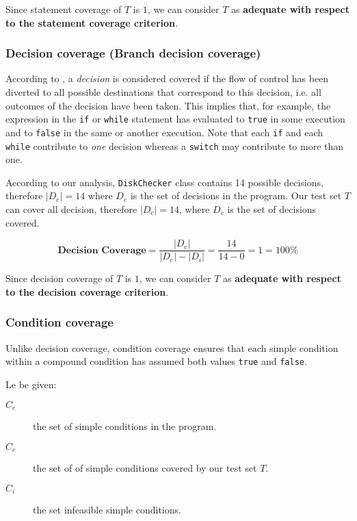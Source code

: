 \documentclass[sigconf]{acmart}
\newcommand{\abs}[1]{\left|#1\right|}
\begin{document}
Since statement coverage of $T$ is $1$, we can consider $T$ as \textbf{adequate with respect to the statement coverage criterion}.

\subsubsection{Decision coverage (Branch decision coverage)}

According to \cite{FoundationSoftwareTesting}, a \textit{decision} is considered covered if the flow of control has been diverted to all possible destinations that correspond to this decision, i.e. all outcomes of the decision have been taken. This implies that, for example, the expression in the \texttt{if} or \texttt{while} statement has evaluated to \texttt{true} in some execution and to \texttt{false} in the same or another execution. Note that each \texttt{if} and each \texttt{while} contribute to \textit{one} decision whereas a \texttt{switch} may contribute to more than one.

According to our analysis, \texttt{DiskChecker} class contains 14 possible decisions, therefore $\abs{D_e} = 14$ where $D_e$ is the set of decisions in the program. Our test set $T$ can cover all decision, therefore $\abs{D_c} = 14$, where $D_c$ is the set of decisions covered.

\begin{equation} 
\textbf{Decision Coverage} = \dfrac{\abs{D_c}}{\abs{D_e} - \abs{D_i}} = \dfrac{14}{14-0} = 1 = 100\%
\end{equation}

Since decision coverage of $T$ is $1$, we can consider $T$ as \textbf{adequate with respect to the decision coverage criterion}.

\subsubsection{Condition coverage}

Unlike decision coverage, condition coverage ensures that each simple condition within a compound condition has assumed both values \texttt{true} and \texttt{false}. 

Le be given:

\begin{description}
\item[$C_e$] the set of simple conditions in the program.
\item[$C_c$] the set of of simple conditions covered  by our test set $T$.
\item[$C_i$] the set infeasible simple conditions.
\end{description}
\end{document}
